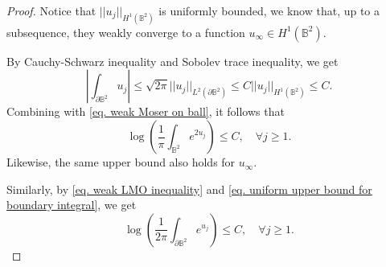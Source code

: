 \documentclass[11pt,a4paper,twoside]{amsart}
\newtheorem{sketch proof}{Sketch of the proof}[section]
\begin{document}
    \begin{proof}
        Notice that $||u_j||_{H^1(\mathbb{B}^2)}$ is uniformly bounded, we know that, up to a subsequence, they weakly converge to a function 
        $u_\infty\in H^1(\mathbb{B}^2)$.

        By Cauchy-Schwarz inequality and Sobolev trace inequality, we get
        \begin{equation}\label{eq. uniform upper bound for boundary integral}
            \left|\int_{\partial \mathbb{B}^2}u_j\right|
        \leq \sqrt{2\pi}
        ||u_j||_{L^2(\partial \mathbb{B}^2)}
        \leq C||u_j||_{H^1(\mathbb{B}^2)}
        \leq C.
        \end{equation}
        Combining with \cref{eq. weak Moser on ball}, it follows that
        \begin{equation}\label{eq. uniform upper bound for e2u}
            \log\left(
        \frac{1}{\pi}\int_{\mathbb{B}^2}e^{2u_j}
        \right)\leq C,\quad \forall j\geq 1.
        \end{equation}
        Likewise, the same upper bound also holds for $u_\infty$.

        Similarly, by \cref{eq. weak LMO inequality} and \cref{eq. uniform upper bound for boundary integral}, we get
        \begin{equation}\label{eq. uniform upper bound for eu}
            \log\left(
        \frac{1}{2\pi}
        \int_{\partial\mathbb{B}^2}e^{u_j}
        \right)\leq C,\quad \forall j\geq 1.
        \end{equation}


\end{proof}
\end{document}
